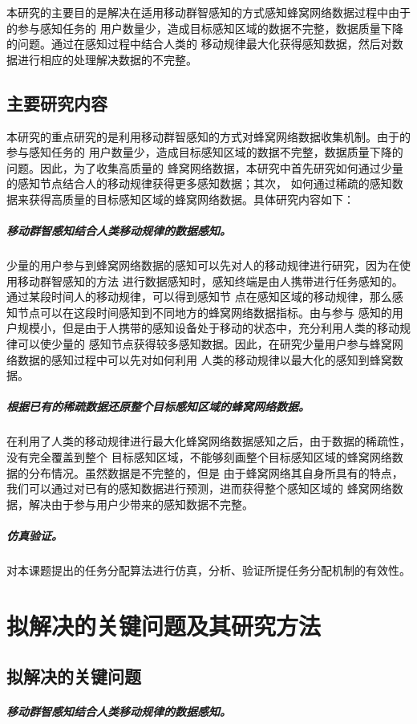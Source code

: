 \documentclass[UTF8]{ctexart}
\begin{document}
本研究的主要目的是解决在适用移动群智感知的方式感知蜂窝网络数据过程中由于的参与感知任务的
用户数量少，造成目标感知区域的数据不完整，数据质量下降的问题。通过在感知过程中结合人类的
移动规律最大化获得感知数据，然后对数据进行相应的处理解决数据的不完整。

\subsection{主要研究内容}

本研究的重点研究的是利用移动群智感知的方式对蜂窝网络数据收集机制。由于的参与感知任务的
用户数量少，造成目标感知区域的数据不完整，数据质量下降的问题。因此，为了收集高质量的
蜂窝网络数据，本研究中首先研究如何通过少量的感知节点结合人的移动规律获得更多感知数据；其次，
如何通过稀疏的感知数据来获得高质量的目标感知区域的蜂窝网络数据。具体研究内容如下：

\subparagraph{移动群智感知结合人类移动规律的数据感知。}

少量的用户参与到蜂窝网络数据的感知可以先对人的移动规律进行研究，因为在使用移动群智感知的方法
进行数据感知时，感知终端是由人携带进行任务感知的。通过某段时间人的移动规律，可以得到感知节
点在感知区域的移动规律，那么感知节点可以在这段时间感知到不同地方的蜂窝网络数据指标。由与参与
感知的用户规模小，但是由于人携带的感知设备处于移动的状态中，充分利用人类的移动规律可以使少量的
感知节点获得较多感知数据。因此，在研究少量用户参与蜂窝网络数据的感知过程中可以先对如何利用
人类的移动规律以最大化的感知到蜂窝数据。

\subparagraph{根据已有的稀疏数据还原整个目标感知区域的蜂窝网络数据。}

在利用了人类的移动规律进行最大化蜂窝网络数据感知之后，由于数据的稀疏性，没有完全覆盖到整个
目标感知区域，不能够刻画整个目标感知区域的蜂窝网络数据的分布情况。虽然数据是不完整的，但是
由于蜂窝网络其自身所具有的特点，我们可以通过对已有的感知数据进行预测，进而获得整个感知区域的
蜂窝网络数据，解决由于参与用户少带来的感知数据不完整。

\subparagraph{仿真验证。}

对本课题提出的任务分配算法进行仿真，分析、验证所提任务分配机制的有效性。

\section{拟解决的关键问题及其研究方法}
\subsection{拟解决的关键问题}
\subparagraph{移动群智感知结合人类移动规律的数据感知。}
\end{document}
